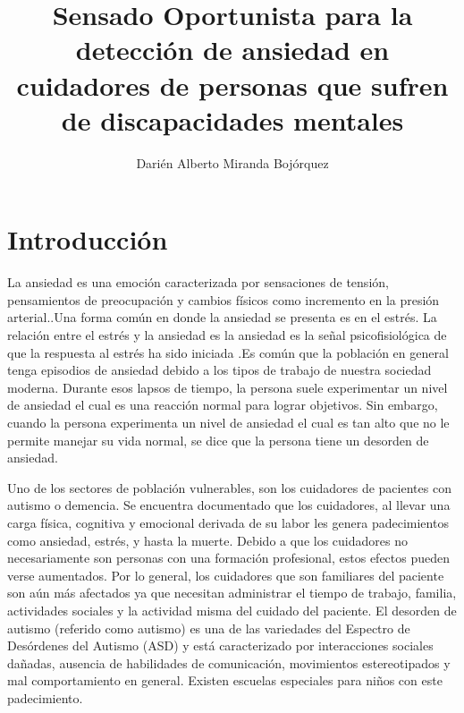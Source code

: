 \documentclass[letterpaper,12pt]{cicese}
\begin{document}
	\doublespace
	\title{Sensado Oportunista para la detecci\'on de ansiedad en cuidadores de personas que sufren de discapacidades mentales}
	\author{Dari\'en Alberto Miranda Boj\'orquez}
	\maketitle
        \maketitle
        \newpage
        \tableofcontents
        \newpage


                \chapter{Introducci\'on}
                        La ansiedad es una emoci\'on caracterizada por sensaciones de tensi\'on, pensamientos de preocupaci\'on y cambios f\'isicos como incremento en la presi\'on arterial.\citep{psychologyapa}.Una forma com\'un en donde la ansiedad se presenta es en el estr\'es. La relaci\'on entre el estr\'es y la ansiedad es la ansiedad es la se\~nal psicofisiol\'ogica de que la respuesta al estr\'es ha sido iniciada \citep{PMID2235645}.Es com\'un que la poblaci\'on en general tenga episodios de ansiedad debido a los tipos de trabajo de nuestra sociedad moderna. Durante esos lapsos de tiempo, la persona suele experimentar un nivel de ansiedad el cual es una reacci\'on normal para lograr objetivos. Sin embargo, cuando la persona experimenta un nivel de ansiedad el cual es tan alto que no le permite manejar su vida normal, se dice que la persona tiene un desorden de ansiedad\citep{repetto2013}.

                        Uno de los sectores de poblaci\'on vulnerables, son los cuidadores de pacientes con autismo o demencia. Se encuentra documentado que los cuidadores, al llevar una carga f\'isica, cognitiva y emocional derivada de su labor les genera padecimientos como ansiedad, estr\'es, y hasta la muerte\citep{Chen2013}. Debido a que los cuidadores no necesariamente son personas con una formaci\'on profesional, estos efectos pueden verse aumentados. Por lo general, los cuidadores que son familiares del paciente son a\'un m\'as afectados ya que necesitan administrar el tiempo de trabajo, familia, actividades sociales y la actividad misma del cuidado del paciente.
                        El desorden de autismo (referido como autismo) es una de las variedades del Espectro de Des\'ordenes del Autismo (ASD) y est\'a caracterizado por interacciones sociales da\~nadas, ausencia de habilidades de comunicaci\'on, movimientos estereotipados y mal comportamiento en general\citep{bernier2010autism}. Existen escuelas especiales para ni\~nos con este padecimiento.
\end{document}
